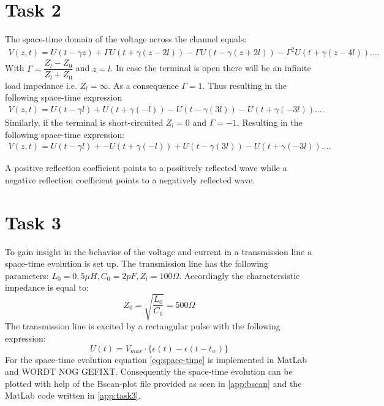 \documentclass[final]{scrreprt} %
\begin{document}
\section*{Task 2}
The space-time domain of the voltage across the channel equals:
\begin{align}
\label{eq:space-time}
V(z,t) = U(t-\gamma z) + \Gamma U(t + \gamma(z-2l)) - \Gamma U(t-\gamma(z+2l)) - \Gamma^2U(t+\gamma(z-4l))....
\end{align}
With $\Gamma = \dfrac{Z_l - Z_0}{Z_l + Z_0}$ and $z = l$. 
In case the terminal is open there will be an infinite load impedance i.e. $Z_l = \infty$. 
As a consequence $\Gamma = 1$. 
Thus resulting in the following space-time expression 
\begin{align*}
V(z,t) = U(t-\gamma l) + U(t + \gamma(-l)) - U(t-\gamma(3l)) - U(t+\gamma(-3l))....
\end{align*}
Similarly, if the terminal is short-circuited $Z_l = 0$ and $\Gamma = -1$. 
Resulting in the following space-time expression:
\begin{align*}
V(z,t) = U(t-\gamma l) + -U(t + \gamma(-l)) + U(t-\gamma(3l)) - U(t+\gamma(-3l))....
\end{align*}

A positive reflection coefficient points to a positively reflected wave while a negative reflection coefficient points to a negatively reflected wave.

\label{ch:sk5-ass1-task3}
\section*{Task 3}
To gain insight in the behavior of the voltage and current in a transmission line a space-time evolution is set up.
The transmission line has the following parameters: $L_0 = 0,5 \mu H, C_0 = 2 pF, Z_l = 100 \Omega$.
Accordingly the charactersistic impedance is equal to:
\begin{equation}
Z_0 = \sqrt{\dfrac{L_0}{C_0}} = 500 \Omega
\end{equation}
The transmission line is excited by a rectangular pulse with the following expression:
\begin{equation}
U(t) = V_{max} \cdot \{\epsilon(t) - \epsilon(t-t_w)\}
\end{equation}
For the space-time evolution equation \ref{eq:space-time} is implemented in MatLab and WORDT NOG GEFIXT. Consequently the space-time evolution can be plotted with help of the Bscan-plot file provided as seen in \ref{app:bscan} and the MatLab code written in \ref{app:task3}.
\end{document}
